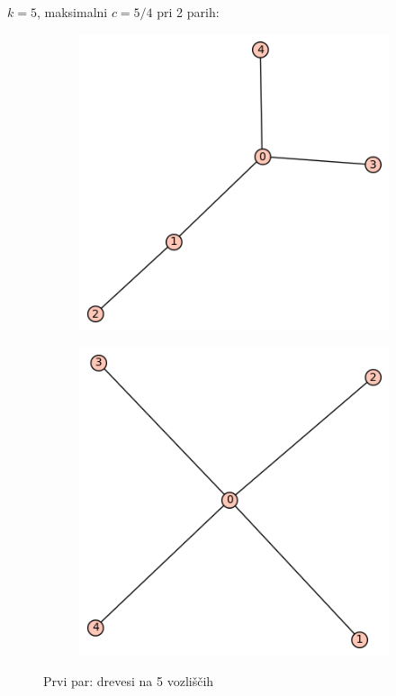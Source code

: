 \documentclass[12pt, a4paper]{article}
\begin{document}
$k=5$, maksimalni $c=5/4$ pri 2 parih:\\

\begin{center}
\begin{figure}[!htb]
\centering
\begin{subfigure}{0.5\textwidth}
  \centering
  \includegraphics[width=0.4\linewidth]{t-6}
\end{subfigure}%
\begin{subfigure}{0.5\textwidth}
  \centering
  \includegraphics[width=0.4\linewidth]{t-7}
\end{subfigure}
\caption{Prvi par: drevesi na 5 vozliščih}
\label{fig:test}
\end{figure}
\end{center}
\end{document}
